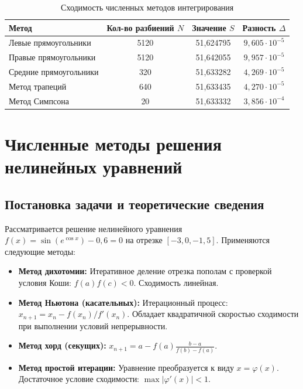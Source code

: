 \documentclass[a4paper,14pt]{extarticle}
\begin{document}
\begin{table}[H]
    \centering
    \caption{Сходимость численных методов интегрирования}
    \label{tab:lab4_res}
    \begin{tabular}{lccc}
        \toprule
        \textbf{Метод} & \textbf{Кол-во разбиений $N$} & \textbf{Значение $S$} & \textbf{Разность $\Delta$} \\
        \midrule
        Левые прямоугольники & 5120 & 51,624795 & $9,605 \cdot 10^{-5}$ \\
        Правые прямоугольники & 5120 & 51,642055 & $9,957 \cdot 10^{-5}$ \\
        Средние прямоугольники & 320 & 51,633282 & $4,269 \cdot 10^{-5}$ \\
        Метод трапеций & 640 & 51,633435 & $4,270 \cdot 10^{-5}$ \\
        Метод Симпсона & 20 & 51,633332 & $3,856 \cdot 10^{-4}$ \\
        \bottomrule
    \end{tabular}
\end{table}


\section{Численные методы решения нелинейных уравнений}

\subsection{Постановка задачи и теоретические сведения}
Рассматривается решение нелинейного уравнения $f(x) = \sin(e^{\cos x}) - 0,6 = 0$ на отрезке $[-3,0, -1,5]$. Применяются следующие методы:
\begin{itemize}
    \item \textbf{Метод дихотомии:} Итеративное деление отрезка пополам с проверкой условия Коши: $f(a)f(c) < 0$. Сходимость линейная.
    \item \textbf{Метод Ньютона (касательных):} Итерационный процесс: $x_{n+1} = x_n - f(x_n)/f'(x_n)$. Обладает квадратичной скоростью сходимости при выполнении условий непрерывности.
    \item \textbf{Метод хорд (секущих):} $x_{n+1} = a - f(a)\frac{b-a}{f(b)-f(a)}$.
    \item \textbf{Метод простой итерации:} Уравнение преобразуется к виду $x = \varphi(x)$. Достаточное условие сходимости: $\max |\varphi'(x)| < 1$.
\end{itemize}
\end{document}
